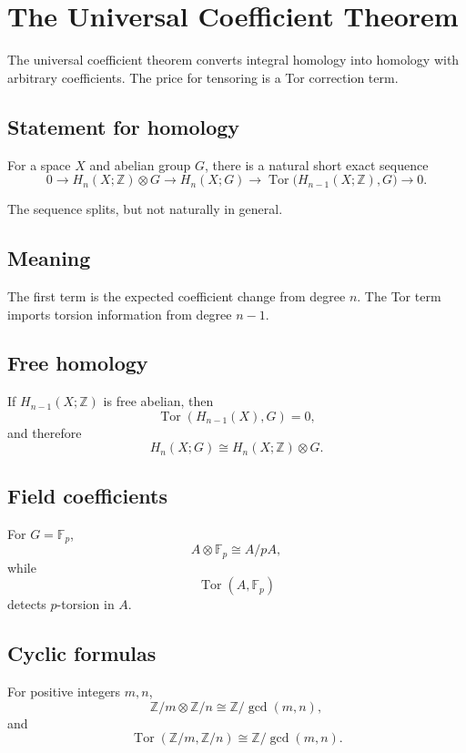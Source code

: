 ﻿\chapter{The Universal Coefficient Theorem}
\label{ch:viii26-universal-coefficient}

The universal coefficient theorem converts integral homology into homology with
arbitrary coefficients.  The price for tensoring is a Tor correction term.

\section{Statement for homology}
\begin{theorem}
\label{thm:viii26-uct}
For a space \(X\) and abelian group \(G\), there is a natural short exact
sequence
\[
0\to H_n(X;\mathbb Z)\otimes G
\longrightarrow H_n(X;G)
\longrightarrow
\operatorname{Tor}\bigl(H_{n-1}(X;\mathbb Z),G\bigr)
\to0.
\]
\end{theorem}

The sequence splits, but not naturally in general.

\section{Meaning}
The first term is the expected coefficient change from degree \(n\).  The Tor
term imports torsion information from degree \(n-1\).

\section{Free homology}
If \(H_{n-1}(X;\mathbb Z)\) is free abelian, then
\[
\operatorname{Tor}(H_{n-1}(X),G)=0,
\]
and therefore
\[
H_n(X;G)\cong H_n(X;\mathbb Z)\otimes G.
\]

\section{Field coefficients}
For \(G=\mathbb F_p\),
\[
A\otimes\mathbb F_p\cong A/pA,
\]
while
\[
\operatorname{Tor}(A,\mathbb F_p)
\]
detects \(p\)-torsion in \(A\).

\section{Cyclic formulas}
For positive integers \(m,n\),
\[
\mathbb Z/m\otimes\mathbb Z/n
\cong
\mathbb Z/\gcd(m,n),
\]
and
\[
\operatorname{Tor}(\mathbb Z/m,\mathbb Z/n)
\cong
\mathbb Z/\gcd(m,n).
\]

